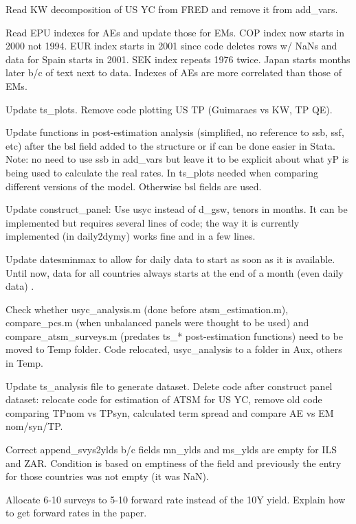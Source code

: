 \documentclass[12pt]{article}
\newcommand{\cmark}{\ding{51}}
\newcommand{\xmark}{\ding{55}}
\newcommand{\done}{\rlap{$\square$}{\raisebox{2pt}{\large\hspace{1pt}\cmark}}%
	\hspace{-2.5pt}}
\newcommand{\wontdo}{\rlap{$\square$}{\large\hspace{1pt}\xmark}}
\begin{document}
\begin{todolist}
\begin{todolist}
		\item[\done] Read KW decomposition of US YC from FRED and remove it from add_vars.
		\item[\done] Read EPU indexes for AEs and update those for EMs. COP index now starts in 2000 not 1994. EUR index starts in 2001 since code deletes rows w/ NaNs and data for Spain starts in 2001. SEK index repeats 1976 twice. Japan starts months later b/c of text next to data. Indexes of AEs are more correlated than those of EMs.
		\item[\done] Update ts_plots. Remove code plotting US TP (Guimaraes vs KW, TP QE).
		\item[\done] Update functions in post-estimation analysis (simplified, no reference to ssb, ssf, etc) after the bsl field added to the structure or if can be done easier in Stata. Note: no need to use ssb in add_vars but leave it to be explicit about what yP is being used to calculate the real rates. In ts_plots needed when comparing different versions of the model. Otherwise bsl fields are used.
		\item[\wontdo] Update construct_panel: Use usyc instead of d_gsw, tenors in months. It can be implemented but requires several lines of code; the way it is currently implemented (in daily2dymy) works fine and in a few lines.
		\item[\done] Update datesminmax to allow for daily data to start as soon as it is available. Until now, data for all countries always starts at the end of a month (even daily data) .
		\item[\done] Check whether usyc_analysis.m (done before atsm_estimation.m), compare_pcs.m (when unbalanced panels were thought to be used) and compare_atsm_surveys.m (predates ts_* post-estimation functions) need to be moved to Temp folder. Code relocated, usyc_analysis to a folder in Aux, others in Temp.
		\item[\done] Update ts_analysis file to generate dataset. Delete code after construct panel dataset: relocate code for estimation of ATSM for US YC, remove old code comparing TPnom vs TPsyn, calculated term spread and compare AE vs EM nom/syn/TP.
		\item[\done] Correct append_svys2ylds b/c fields mn_ylds and ms_ylds are empty for ILS and ZAR. Condition is based on emptiness of the field and previously the entry for those countries was not empty (it was NaN).
		\item[\done] Allocate 6-10 surveys to 5-10 forward rate instead of the 10Y yield. Explain how to get forward rates in the paper.

\end{todolist}
\end{todolist}
\end{document}
